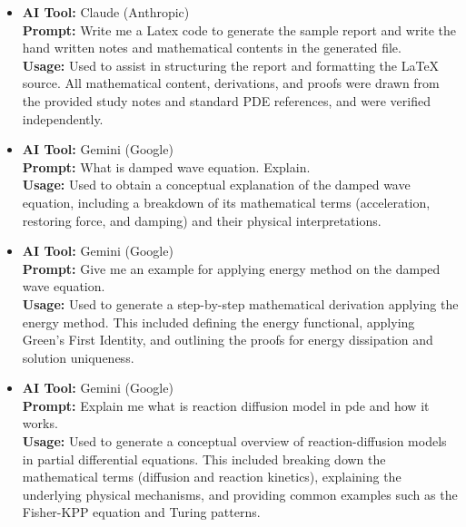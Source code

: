 \documentclass[12pt,a4paper]{article}
\theoremstyle{plain}
\theoremstyle{definition}
\begin{document}
\begin{itemize}
    \item \textbf{AI Tool:} Claude (Anthropic) \\
    \textbf{Prompt:} Write me a Latex code to generate the sample report and write the hand written notes and mathematical contents in the generated file. \\
    \textbf{Usage:} Used to assist in structuring the report and formatting the \LaTeX{} source. All mathematical content, derivations, and proofs were drawn from the provided study notes and standard PDE references, and were verified independently.

    \medskip %

    \item \textbf{AI Tool:} Gemini (Google) \\
    \textbf{Prompt:} What is damped wave equation. Explain. \\
    \textbf{Usage:} Used to obtain a conceptual explanation of the damped wave equation, including a breakdown of its mathematical terms (acceleration, restoring force, and damping) and their physical interpretations.

    
    \medskip %

    \item \textbf{AI Tool:} Gemini (Google) \\
    \textbf{Prompt:} Give me an example for applying energy method on the damped wave equation. \\
    \textbf{Usage:} Used to generate a step-by-step mathematical derivation applying the energy method. This included defining the energy functional, applying Green's First Identity, and outlining the proofs for energy dissipation and solution uniqueness.


    \medskip %

    \item \textbf{AI Tool:} Gemini (Google) \\
    \textbf{Prompt:} Explain me what is reaction diffusion model in pde and how it works. \\
    \textbf{Usage:} Used to generate a conceptual overview of reaction-diffusion models in partial differential equations. This included breaking down the mathematical terms (diffusion and reaction kinetics), explaining the underlying physical mechanisms, and providing common examples such as the Fisher-KPP equation and Turing patterns.


\end{itemize}
\end{document}
